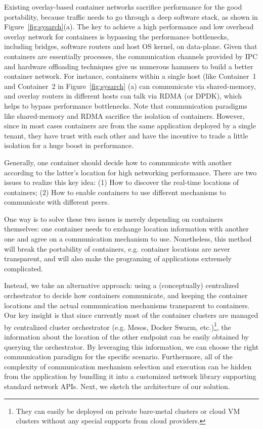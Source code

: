 Existing overlay-based container networks sacrifice performance for 
the good portability, because traffic needs to go through a deep software 
stack, as shown in Figure~\ref{fig:sysarch}(a). 
The key to achieve a high performance and low overhead overlay network for
containers is bypassing the performance bottlenecks, including bridges, software
routers and host OS kernel, on data-plane. Given that containers are essentially
processes, the communication channels provided by IPC and hardware offloading
techniques give us numerous hammers to build a better container network. For
instance, containers within a single host (like Container~1 and Container~2 in
Figure~\ref{fig:sysarch} (a) 
can communicate via shared-memory, and overlay routers
in different hosts can talk via RDMA (or DPDK), which helps to bypass performance
bottlenecks. Note that communication paradigms like shared-memory and RDMA 
sacrifice the isolation of containers. However, since in most cases
containers are from the same application deployed by a single tenant, they
have trust with each other and have the incentive to trade a little isolation
for a huge boost in performance.

Generally, one container should decide how to communicate
with another according to the latter's location for high networking performance. 
There are two issues to realize this key idea: (1) How to discover the real-time locations of containers; (2) How to enable containers
to use different mechanisms to communicate with different peers.

One way is to solve these two issues is merely depending on containers themselves:
one container needs to exchange location information with another one and
agree on a communication mechanism to use. Nonetheless, this method will 
break the portability of containers, e.g. container locations are never transparent, and will also make the programing of applications extremely 
complicated. 

Instead, we take an alternative approach: using a (conceptually) centralized orchestrator to decide how containers communicate, and keeping the container locations and the 
actual
communication mechanisms transparent to containers. Our key insight is that since currently most of the container clusters are managed by centralized cluster orchestrator (e.g. Mesos, Docker Swarm, etc.)\footnote{They can easily be deployed on private bare-metal clusters or cloud VM clusters without any special supports from cloud providers.}, the information about the location of the other endpoint
can be easily obtained by querying the orchestrator. By leveraging this
information, we can choose the right communication paradigm for the specific
scenario. Furthermore, all of the complexity of communication mechanism selection
and execution can be hidden from the application
by bundling it into a customized network library supporting standard 
network APIs.
Next, we sketch the architecture of our solution.

